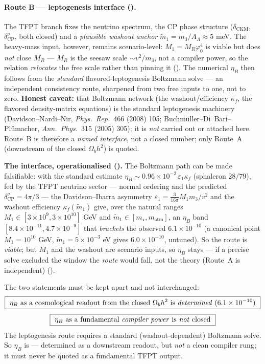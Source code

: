 \documentclass[11pt,a4paper]{article}
\begin{document}
\paragraph{Route B --- leptogenesis interface (\mC).} The TFPT branch fixes the neutrino
spectrum, the CP phase structure ($\delta_{\mathrm{CKM}}$, $\delta^\nu_{\mathrm{CP}}$, both closed) and a
\emph{plausible washout anchor} $\tilde m_1=m_3/A_\Lambda\approx5$ meV. The heavy-mass input, however,
remains scenario-level: $M_1=M_R\varphi_0^4$ is viable but does \emph{not} close $M_R$ --- $M_R$ is the
seesaw scale $\sim v^2/m_3$, not a compiler power, so the relation \emph{relocates} the free scale rather
than pinning it (). The numerical $\eta_B$ then follows from the
\emph{standard} flavored-leptogenesis Boltzmann solve --- an independent consistency route, sharpened from
two free inputs to one, not to zero. \textbf{Honest caveat:} that Boltzmann network (the
washout/efficiency $\kappa_f$, the flavored density-matrix equations) is the standard leptogenesis
machinery (Davidson--Nardi--Nir, \emph{Phys.\ Rep.}\ 466 (2008) 105; Buchm\"uller--Di~Bari--Pl\"umacher,
\emph{Ann.\ Phys.}\ 315 (2005) 305); it is \emph{not} carried out or attached here. Route~B is therefore a
\emph{named interface}, not a closed number; only Route~A (downstream of the closed $\Omega_b h^2$) is
quoted.

\noindent\textbf{The interface, operationalised (\mC).} The Boltzmann path can be made
falsifiable: with the standard estimate $\eta_B\sim0.96\times10^{-2}\,\varepsilon_1\kappa_f$
(sphaleron $28/79$), fed by the TFPT neutrino sector --- normal ordering and the predicted
$\delta^\nu_{\mathrm{CP}}=4\pi/3$ --- the Davidson--Ibarra asymmetry
$\varepsilon_1=\tfrac{3}{16\pi}M_1 m_3/v^2$ and the washout efficiency $\kappa_f(\tilde m_1)$ give,
over the natural ranges $M_1\in[3\times10^9,3\times10^{10}]$ GeV and
$\tilde m_1\in[m_\star,m_{\mathrm{atm}}]$, an $\eta_B$ band $[8.4\times10^{-11},4.7\times10^{-9}]$
that \emph{brackets} the observed $6.1\times10^{-10}$ (a canonical point $M_1=10^{10}$ GeV,
$\tilde m_1=5\times10^{-3}$ eV gives $6.0\times10^{-10}$, untuned). So the route is \emph{viable};
but $M_1$ and the washout are scenario inputs, so $\eta_B$ stays \mC --- if a precise solve
excluded the window the \emph{route} would fall, not the theory (Route~A is independent)
().

\begin{keybox}
The two statements must be kept apart and not interchanged:
\[
  \boxed{\ \eta_B\ \text{as a cosmological readout from the closed }\Omega_b h^2\ \text{is \emph{determined}}\ (6.1\times10^{-10})\ }
\]
\[
  \boxed{\ \eta_B\ \text{as a fundamental \emph{compiler power} is \emph{not} closed}\ }
\]
The leptogenesis route requires a standard (washout-dependent) Boltzmann solve. So $\eta_B$ is \mC ---
determined as a downstream readout, but \emph{not} a clean compiler rung; it must never be quoted as a
fundamental TFPT output.
\end{keybox}
\end{document}

